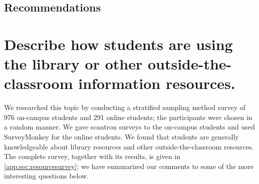 \subsection{Recommendations}





\section{Describe how students are using the library or other
outside-the-classroom information resources.  }
We researched this topic by conducting a stratified sampling method
survey of 976 on-campus students and 291 online students; the participants were
chosen in a random manner.  We gave scantron surveys to the on-campus students
and used SurveyMonkey for the online students. We found that students are
generally knowledgeable about library resources and other outside-the-classroom
resources.  The complete survey, together with its results, is given in
\vref{app:sec:resourcesurvey}; we have summarized our comments to some of the 
more interesting questions below.

